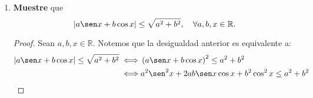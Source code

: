 \documentclass[12pt]{article}
\begin{document}
\begin{enumerate}
\begin{proof}
\begin{equation*}
        \end{equation*}
        De (III): Sea $x\in\mathbb{R}/\{1\}$ tal que $\abs{x-3}\leq4/9$. En particular como $4/9<3/2$ entonces $\abs{x-3}\leq3/2$. Por tanto, usando la parte (II) obtenemos que:
        \begin{equation*}
                \frac{\abs{x}}{\abs{1-x}}\leq9\Rightarrow-\frac{\abs{x}}{\abs{1-x}}\geq-9
        \end{equation*}
        Por la parte (I), siendo que $x\in\mathbb{R}/\{1\}$, tenemos que:
        \begin{equation*}
            \abs{\frac{x^2-3}{1-x}-2}\geq5-\frac{\abs{x}\abs{x-3}}{\abs{1-x}}.
        \end{equation*}
        Usando la desigualdad anterior, obtenemos que:
        \begin{equation*}
            \begin{split}
                \abs{\frac{x^2-3}{1-x}-2}\geq&5-\frac{\abs{x}\abs{x-3}}{\abs{1-x}}\\
                =&5-\frac{\abs{x}}{\abs{1-x}}\abs{x-3}\\
                \geq&5-9\cdot\abs{x-3}\\
                =&5+9\cdot(-\abs{x-3})\\
                \geq&5+9\cdot\left(-\frac{4}{9}\right)\\
                =&5-4\\
                =&1\\
                \Rightarrow\abs{\frac{x^2-3}{1-x}-2}\geq&1
            \end{split}
        \end{equation*}
        Pues $\abs{x-3}\leq4/9\Rightarrow-\abs{x-3}\geq-4/9$.
        \qed
    \end{proof}
    \item \textbf{Muestre} que
    \begin{equation*}
        \abs{a\sen x+b\cos x}\leq\sqrt{a^2+b^2}, \quad \forall a,b,x\in\mathbb{R}.
    \end{equation*}
    \begin{proof}
        Sean $a,b,x\in\mathbb{R}$. Notemos que la desigualdad anterior es equivalente a: 
        \begin{equation*}
            \begin{split}
                \abs{a\sen x+b\cos x}\leq\sqrt{a^2+b^2}\iff&\left(a\sen x+b\cos x\right)^2\leq a^2+b^2\\
                \iff&a^2\sen^2 x+2ab\sen x\cos x+b^2\cos^2 x\leq a^2+b^2\\

\end{split}
\end{equation*}
\end{proof}
\end{enumerate}
\end{document}
